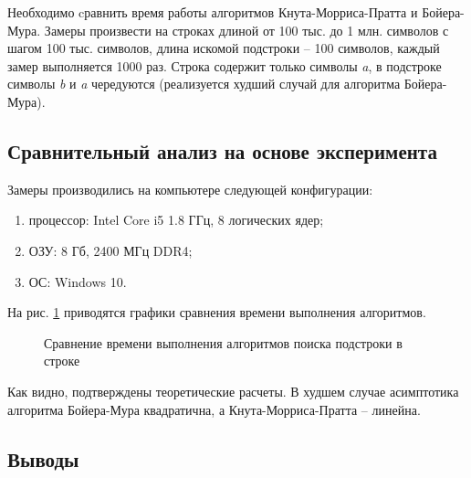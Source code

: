 \documentclass[a4paper,12pt]{article}
\begin{document}
Необходимо cравнить время работы алгоритмов Кнута-Морриса-Пратта и Бойера-Мура.  Замеры произвести на строках длиной от 100 тыс. до 1 млн. символов с шагом 100 тыс. символов, длина искомой подстроки -- 100 символов, каждый замер выполняется 1000 раз.
Строка содержит только символы \textit{a},
в подстроке символы \textit{b} и \textit{a}
чередуются (реализуется худший случай для
алгоритма Бойера-Мура).

\subsection{Сравнительный анализ на основе эксперимента}

Замеры производились на компьютере следующей конфигурации: 
\begin{enumerate}
\item[1)] процессор: Intel Core i5 1.8 ГГц, 8 логических ядер; 
\item[2)] ОЗУ: 8 Гб, 2400 МГц DDR4;
\item[3)] ОС: Windows 10.
\end{enumerate}

На рис. \ref{fig:chart_substr} приводятся графики сравнения времени выполнения алгоритмов.

\begin{figure}[h!]
\caption{Сравнение времени выполнения алгоритмов поиска подстроки в строке}
\label{fig:chart_substr}
\end{figure}

Как видно, подтверждены теоретические расчеты. В худшем случае
асимптотика алгоритма Бойера-Мура квадратична, а Кнута-Морриса-Пратта -- линейна.

\subsection*{Выводы}
\end{document}
